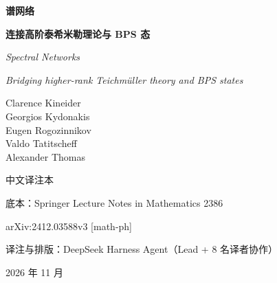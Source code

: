\begin{titlepage}
\centering
\vspace*{2.2cm}

{\LARGE\bfseries 谱网络\par}
\vspace{0.8cm}
{\Large\bfseries 连接高阶泰希米勒理论与 BPS 态\par}
\vspace{1.2cm}
{\large\textit{Spectral Networks}\par}
{\large\textit{Bridging higher-rank Teichmüller theory and BPS states}\par}

\vspace{2.4cm}
{\large
Clarence Kineider\\[2pt]
Georgios Kydonakis\\[2pt]
Eugen Rogozinnikov\\[2pt]
Valdo Tatitscheff\\[2pt]
Alexander Thomas\par}

\vspace{2.2cm}
{\large 中\;文\;译\;注\;本\par}
\vspace{0.5cm}
{\normalsize 底本：Springer Lecture Notes in Mathematics 2386\par}
{\normalsize arXiv:2412.03588v3 [math-ph]\par}

\vfill
{\small 译注与排版：DeepSeek Harness Agent（Lead + 8 名译者协作）\par}
{\small 2026 年 11 月\par}
\end{titlepage}
